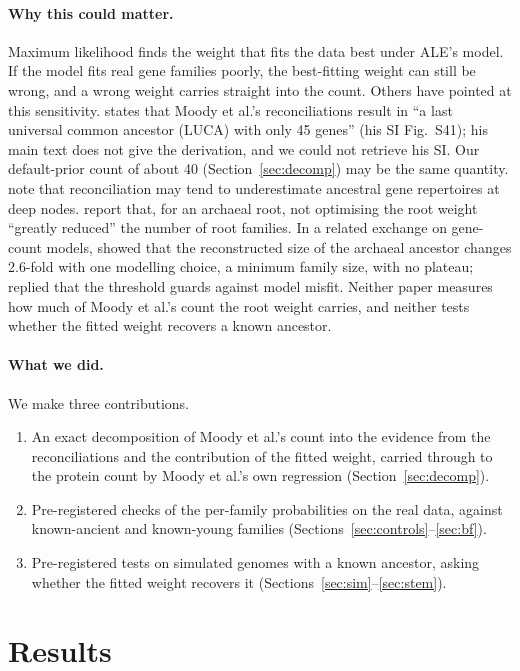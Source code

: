 \documentclass[11pt]{article}
\begin{document}
\paragraph{Why this could matter.} Maximum likelihood finds the weight that fits the data best under ALE's model. If the model fits real gene families poorly, the best-fitting weight can still be wrong, and a wrong weight carries straight into the count. Others have pointed at this sensitivity. \citet{csuros2026} states that Moody et al.'s reconciliations result in ``a last universal common ancestor (LUCA) with only 45 genes'' (his SI Fig.~S41); his main text does not give the derivation, and we could not retrieve his SI. Our default-prior count of about 40 (Section~\ref{sec:decomp}) may be the same quantity. \citet{williams2023} note that reconciliation may tend to underestimate ancestral gene repertoires at deep nodes. \citet{szollosi2026} report that, for an archaeal root, not optimising the root weight ``greatly reduced'' the number of root families. In a related exchange on gene-count models, \citet{szollosi2026letter} showed that the reconstructed size of the archaeal ancestor changes 2.6-fold with one modelling choice, a minimum family size, with no plateau; \citet{gagnon2026} replied that the threshold guards against model misfit. Neither paper measures how much of Moody et al.'s count the root weight carries, and neither tests whether the fitted weight recovers a known ancestor.

\paragraph{What we did.} We make three contributions.
\begin{enumerate}
  \item An exact decomposition of Moody et al.'s count into the evidence from the reconciliations and the contribution of the fitted weight, carried through to the protein count by Moody et al.'s own regression (Section~\ref{sec:decomp}).
  \item Pre-registered checks of the per-family probabilities on the real data, against known-ancient and known-young families (Sections~\ref{sec:controls}--\ref{sec:bf}).
  \item Pre-registered tests on simulated genomes with a known ancestor, asking whether the fitted weight recovers it (Sections~\ref{sec:sim}--\ref{sec:stem}).
\end{enumerate}

\section{Results}
\end{document}

